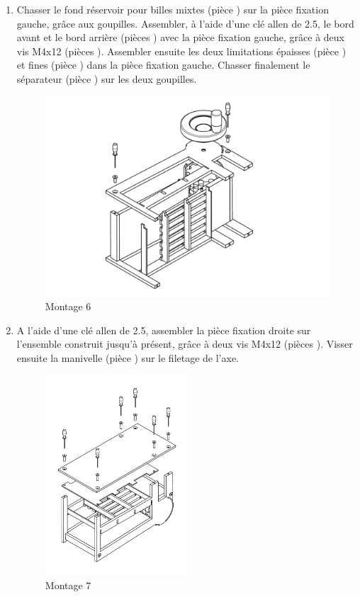 \begin{enumerate}
\item Chasser le fond réservoir pour billes mixtes (pièce ) sur la pièce fixation gauche, grâce aux goupilles. Assembler, à l'aide d'une clé allen de 2.5, le bord avant et le bord arrière (pièces ) avec la pièce fixation gauche, grâce à deux vis M4x12 (pièces ). Assembler ensuite les deux limitations épaisses (pièce ) et fines (pièce ) dans la pièce fixation gauche. Chasser finalement le séparateur (pièce ) sur les deux goupilles.

\newpage

\begin{figure}
    \centering
    \includegraphics[width=\textwidth]{Graphics/Montage/6.pdf}
    \caption{Montage 6}
    \label{fig:Montage6}
\end{figure}

\item A l'aide d'une clé allen de 2.5, assembler la pièce fixation droite sur l'ensemble construit jusqu'à présent, grâce à deux vis M4x12 (pièces ). Visser ensuite la manivelle (pièce ) sur le filetage de l'axe. 

\newpage

\begin{figure}
    \centering
    \includegraphics[width=0.5\textwidth]{Graphics/Montage/7.pdf}
    \caption{Montage 7}
    \label{fig:Montage7}
\end{figure}


\end{enumerate}
